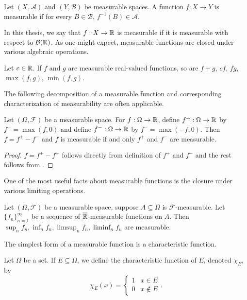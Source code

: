 \begin{definition}
Let $(X, \mathcal{A})$ and $(Y, \mathcal{B})$ be measurable spaces. A function $f : X \to Y$ is measurable if for every $B \in \mathcal{B}$, $f^{-1}(B) \in \mathcal{A}$.
\end{definition}

In this thesis, we say that $f : X \to {\mathbb R}$ is measurable if it is measurable with respect to ${\mathcal B}({\mathbb R})$.
As one might expect, measurable functions are closed under various algebraic operations.

\begin{proposition}
\label{thm:measure:measurablefnsalgclosure}
Let $c \in {\mathbb R}$. If $f$ and $g$ are measurable real-valued functions, so are $f + g$, $cf$, $fg$, $\max(f, g)$, $\min(f, g)$.
\end{proposition}

The following decomposition of a measurable function and corresponding characterization of measurability are often applicable.
\begin{proposition}
\label{thm:measure:measurablefnplusminus}
Let $(\Omega, \mathcal{F})$ be a measurable space. For $f : \Omega \to {\mathbb R}$, define
$f^{+} : \Omega \to {\mathbb R}$ by $f^{+} = \max(f, 0)$ and define $f^{-} : \Omega \to {\mathbb R}$ by $f^{-} = \max(-f, 0)$. Then $f = f^{+} - f^{-}$ and $f$ is measurable if and only $f^{+}$ and $f^{-}$ are measurable.
\end{proposition}
\begin{proof}
$f = f^{+} - f^{-}$ follows directly from definition of $f^{+}$ and $f^{-}$ and the rest follows from .
\end{proof}
One of the most useful facts about measurable functions is the closure under various limiting operations.

\begin{proposition}
Let $(\Omega, \mathcal{F})$ be a measurable space, suppose $A \subseteq \Omega$ is $\mathcal{F}$-measurable.  Let $\{ f_n \}_{n=1}^\infty$ be a sequence of $\overline{{\mathbb R}}$-measurable functions on $A$. Then $\sup_{n} f_n, \inf_{n} f_n, \limsup_{n} f_n, \liminf_n f_n$ are measurable.
\end{proposition}

The simplest form of a measurable function is a characteristic function.

\begin{definition}
Let $\Omega$ be a set. If $E \subseteq \Omega$, we define the characteristic function of $E$, denoted $\chi_E$, by
\[ \chi_E(x) = \begin{cases} 
      1 & x \in E \\
      0 & x \not \in E
   \end{cases}.
\]
\end{definition}

